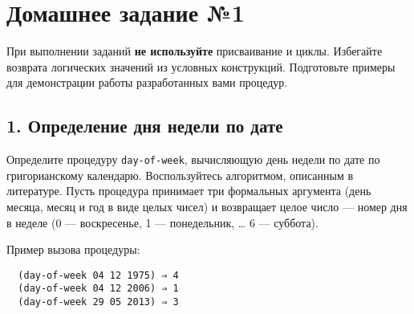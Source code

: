 \documentclass[11pt]{article}
\author{Starovoytov Alexandr}
\date{\today}
\title{}
\begin{document}
\tableofcontents


\section{Домашнее задание №1}
\label{домашнее-задание-1}
При выполнении заданий \textbf{не используйте} присваивание и циклы. Избегайте
возврата логических значений из условных конструкций. Подготовьте
примеры для демонстрации работы разработанных вами процедур.

\subsection{1. Определение дня недели по дате}
\label{определение-дня-недели-по-дате}
Определите процедуру \texttt{day-of-week}, вычисляющую день недели по дате по
григорианскому календарю. Воспользуйтесь алгоритмом, описанным в
литературе. Пусть процедура принимает три формальных аргумента (день
месяца, месяц и год в виде целых чисел) и возвращает целое число ---
номер дня в неделе (0 --- воскресенье, 1 --- понедельник, \ldots{} 6 ---
суббота).

Пример вызова процедуры:

\begin{verbatim}
  (day-of-week 04 12 1975) ⇒ 4
  (day-of-week 04 12 2006) ⇒ 1
  (day-of-week 29 05 2013) ⇒ 3
\end{verbatim}
\end{document}
